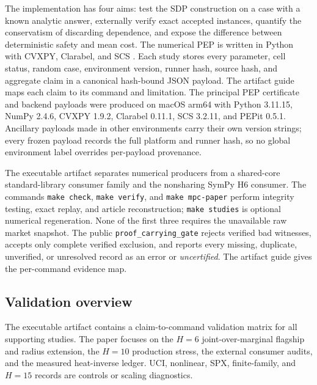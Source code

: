 \documentclass[smallextended]{svjour3}
\begin{document}
The implementation has four aims: test the SDP construction on a case with a
known analytic answer, externally verify exact accepted instances, quantify
the conservatism of discarding dependence, and expose the difference between
deterministic safety and mean cost.  The numerical PEP is written in Python
with CVXPY, Clarabel, and SCS
\citep{DiamondBoyd2016,GoulartChen2026,ODonoghueEtAl2016}.  Each study
stores every parameter, cell status, random case, environment version, runner
hash, source hash, and aggregate claim in a canonical hash-bound JSON payload.
The artifact guide maps each claim to its command and limitation.
The principal PEP certificate and backend payloads were produced on macOS
arm64 with Python 3.11.15, NumPy 2.4.6, CVXPY 1.9.2, Clarabel 0.11.1, SCS
3.2.11, and PEPit 0.5.1.  Ancillary payloads made in other environments carry
their own version strings; every frozen payload records the full platform and
runner hash, so no global environment label overrides per-payload provenance.

The executable artifact separates numerical producers from a shared-core
standard-library consumer family and the nonsharing SymPy H6 consumer.  The
commands \texttt{make check},
\texttt{make verify}, and \texttt{make mpc-paper} perform integrity testing,
exact replay, and article reconstruction; \texttt{make studies} is optional
numerical regeneration.  None of the first three requires the unavailable raw
market snapshot.  The public \texttt{proof\_carrying\_gate} rejects verified
bad witnesses, accepts only complete verified exclusion, and reports every
missing, duplicate, unverified, or unresolved record as an error or
\emph{uncertified}.  The artifact guide gives the per-command evidence map.

\subsection{Validation overview}

The executable artifact contains a claim-to-command validation matrix for all
supporting studies.  The paper focuses on the $H=6$ joint-over-marginal
flagship and radius extension, the $H=10$ production stress, the external
consumer audits, and the measured heat-inverse ledger.  UCI, nonlinear, SPX,
finite-family, and $H=15$ records are controls or scaling diagnostics.
\end{document}
